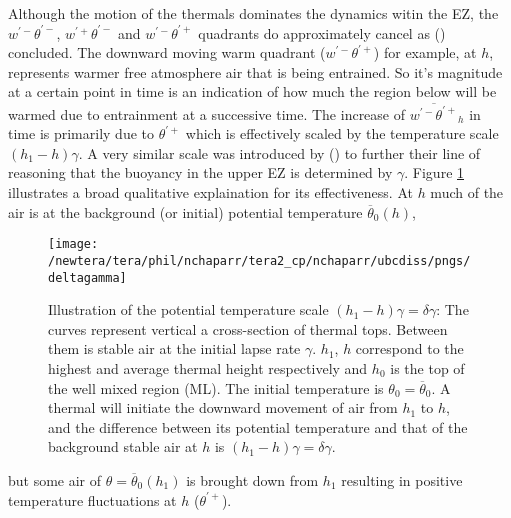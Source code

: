  Although the motion of the thermals dominates the dynamics witin the \acs{EZ}, the $w^{'-}\theta^{'-}$, $w^{'+}\theta^{'-}$ and $w^{'-}\theta^{'+}$ quadrants do approximately cancel as \citeauthor{SullMoengStev} (\citeyear{SullMoengStev}) concluded. The downward moving warm quadrant ($w^{'-}\theta^{'+}$) for example, at $h$, represents warmer free atmosphere air that is being entrained.  So it's magnitude at a certain point in time is an indication of how much the region below will be warmed due to entrainment at a successive time.  The increase of $\overline{w^{'-}\theta^{'+}}_{h}$ in time is primarily due to $\theta^{'+}$ which is effectively scaled by the temperature scale $(h_{1}-h)\gamma$.  A very similar scale was introduced by \citeauthor{GarciaMellado} (\cite{GarciaMellado}) to further their line of reasoning that the buoyancy in the upper \acs{EZ} is determined by $\gamma$. Figure \ref{fig:deltagamma} illustrates a broad qualitative explaination for its effectiveness.  At $h$ much of the air is at the background (or initial) potential temperature $\overline{\theta}_{0}(h)$, 

\begin{figure}[htbp]
    \centering
    \texttt{[image: /newtera/tera/phil/nchaparr/tera2\_cp/nchaparr/ubcdiss/pngs/deltagamma]}
    \caption[Illustration of \acs{EZ} Potential Temperature Scale based on $\gamma$]{Illustration of the potential temperature scale $(h_{1}-h)\gamma = \delta \gamma$: The curves represent vertical a cross-section of thermal tops.  Between them is stable air at the initial lapse rate $\gamma$. $h_{1}$, $h$ correspond to the highest and average thermal height respectively and $h_{0}$ is the top of the well mixed region (\acs{ML}).  The initial temperature is $\theta_{0} = \overline{\theta}_{0}$. A thermal will initiate the downward movement of air from $h_{1}$ to $h$, and the difference between its potential temperature and that of the background stable air at $h$ is $(h_{1}-h)\gamma = \delta \gamma$.}
    \label{fig:deltagamma}   %
\end{figure}

but some air of $\theta = \overline{\theta}_{0}(h_{1})$ is brought down from $h_{1}$ resulting in positive temperature fluctuations at $h$ ($\theta^{'+}$).\\

